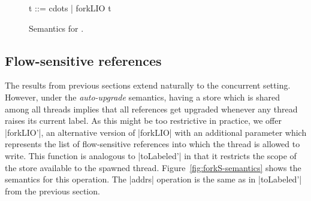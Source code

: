 \begin{figure}[ht]
\small
\begin{code}
t    ::= cdots  | forkLIO t
\end{code}
  \caption{Semantics for \lioconc{}.}
  \label{fig:conc-semantics}
\end{figure}

\subsection{Flow-sensitive references}

The results from previous sections extend naturally to the concurrent
setting. However, under the \emph{auto-upgrade} semantics, having a
store which is shared among all threads implies that all references
get upgraded whenever any thread raises its current label. As this
might be too restrictive in practice, we offer |forkLIO'|, an
alternative version of |forkLIO| with an additional parameter which
represents the list of flow-sensitive references into which the thread
is allowed to write. This function is analogous to |toLabeled'| in
that it restricts the scope of the store available to the spawned
thread. Figure~\ref{fig:forkS-semantics} shows the semantics for this
operation. The |addrs| operation is the same as in |toLabeled'| from
the previous section.

